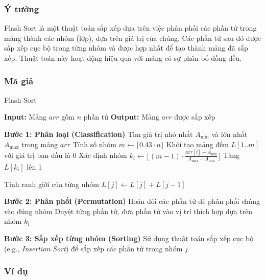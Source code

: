 \subsubsection{Ý tưởng}
Flash Sort là một thuật toán sắp xếp dựa trên việc phân phối các phần tử trong mảng thành các nhóm (lớp), dựa trên giá trị của chúng. Các phần tử sau đó được sắp xếp cục bộ trong từng nhóm và được hợp nhất để tạo thành mảng đã sắp xếp. Thuật toán này hoạt động hiệu quả với mảng có sự phân bố đồng đều. \cite{flashsort1}

\subsubsection{Mã giả}

\begin{algorithm}[H]
\caption{Flash Sort}
\begin{algorithmic}[1]
    \State \textbf{Input:} Mảng $arr$ gồm $n$ phần tử
    \State \textbf{Output:} Mảng $arr$ được sắp xếp
    
    \State \textbf{Bước 1: Phân loại (Classification)}
    \State Tìm giá trị nhỏ nhất $A_{\text{min}}$ và lớn nhất $A_{\text{max}}$ trong mảng $arr$
    \State Tính số nhóm $m \gets \lfloor 0.43 \cdot n \rfloor$
    \State Khởi tạo mảng đếm $L[1..m]$ với giá trị ban đầu là 0
        \State Xác định nhóm $k_i \gets \lfloor (m - 1) \cdot \frac{arr[i] - A_{\text{min}}}{A_{\text{max}} - A_{\text{min}}} \rfloor$
        \State Tăng $L[k_i]$ lên 1
    \EndFor
    
    \State Tính ranh giới của từng nhóm
        \State $L[j] \gets L[j] + L[j-1]$
    \EndFor
    
    \State \textbf{Bước 2: Phân phối (Permutation)}
    \State Hoán đổi các phần tử để phân phối chúng vào đúng nhóm
    \State Duyệt từng phần tử, đưa phần tử vào vị trí thích hợp dựa trên nhóm $k_i$
    
    \State \textbf{Bước 3: Sắp xếp từng nhóm (Sorting)}
        \State Sử dụng thuật toán sắp xếp cục bộ (e.g., \textit{Insertion Sort}) để sắp xếp các phần tử trong nhóm $j$
    \EndFor
\EndProcedure
\end{algorithmic}
\end{algorithm}

\subsubsection{Ví dụ}

